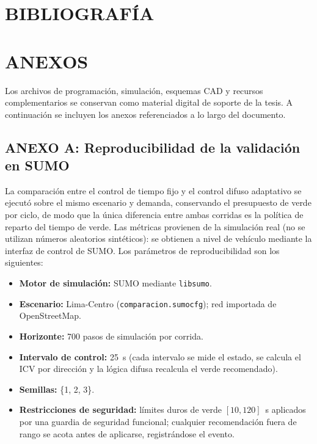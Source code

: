 \chapter*{BIBLIOGRAFÍA}\label{bibliografia}


\chapter*{ANEXOS}\label{anexos}

\noindent Los archivos de programación, simulación, esquemas CAD y recursos complementarios se conservan
como material digital de soporte de la tesis. A continuación se incluyen los anexos referenciados a lo largo
del documento.

\section*{ANEXO A: Reproducibilidad de la validación en SUMO}
\label{anexo:sumo}

La comparación entre el control de tiempo fijo y el control difuso adaptativo se ejecutó sobre el mismo
escenario y demanda, conservando el presupuesto de verde por ciclo, de modo que la única diferencia entre
ambas corridas es la política de reparto del tiempo de verde. Las métricas provienen de la simulación real
(no se utilizan números aleatorios sintéticos): se obtienen a nivel de vehículo mediante la interfaz de
control de SUMO. Los parámetros de reproducibilidad son los siguientes:

\begin{itemize}
\item \textbf{Motor de simulación:} SUMO mediante \texttt{libsumo}.
\item \textbf{Escenario:} Lima-Centro (\texttt{comparacion.sumocfg}); red importada de OpenStreetMap.
\item \textbf{Horizonte:} 700 pasos de simulación por corrida.
\item \textbf{Intervalo de control:} 25~s (cada intervalo se mide el estado, se calcula el ICV por
dirección y la lógica difusa recalcula el verde recomendado).
\item \textbf{Semillas:} \{1, 2, 3\}.
\item \textbf{Restricciones de seguridad:} límites duros de verde $[10, 120]$~s aplicados por una guardia de
seguridad funcional; cualquier recomendación fuera de rango se acota antes de aplicarse, registrándose el
evento.
\end{itemize}

